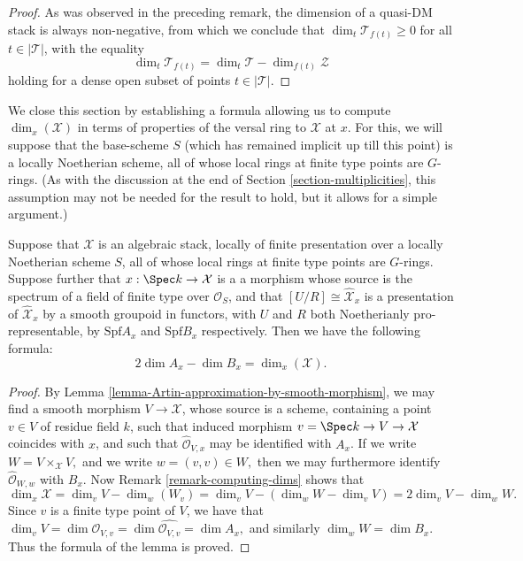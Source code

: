 \begin{proof}
As was observed in the preceding remark,
the dimension of a quasi-DM stack is always non-negative,
from which we conclude that $\dim_t \mathcal{T}_{f(t)} \geq 0$
for all $t \in |\mathcal{T}|$, with the equality
$$
\dim_t \mathcal{T}_{f(t)} = \dim_t \mathcal{T} - \dim_{f(t)} \mathcal{Z}
$$
holding
for a dense open subset of points $t\in |\mathcal{T}|$.
\end{proof}

\noindent
We close this section by establishing a formula allowing us to
compute $\dim_x(\mathcal{X})$ in terms of properties of the versal ring
to $\mathcal{X}$ at $x$.
For this,
we will suppose that the base-scheme $S$ (which has remained implicit
up till this point) is a locally Noetherian scheme, all of whose local rings
at finite type points are $G$-rings. (As with the discussion at the
end of Section \ref{section-multiplicities}, this assumption may not be
needed for the result to hold, but it allows for a simple argument.)

\begin{lemma}
\label{lemma-dimension-formula}
Suppose that $\mathcal{X}$ is an algebraic
stack, locally of finite presentation over a locally Noetherian
scheme $S$, all of whose local rings at finite type points
are $G$-rings.  Suppose further
that $x:\Spec k\to\mathcal{X}$ is a a morphism whose source is the spectrum
of a field of finite type over $\mathcal{O}_S$, and that
$[U/R] \cong \widehat{\mathcal{X}}_x$
is a presentation of $\widehat{\mathcal{X}}_x$
by a smooth groupoid in functors,
with $U$ and $R$ both Noetherianly pro-representable, by
$\text{Spf} A_x$ and $\text{Spf} B_x$ respectively. Then we have the following
formula:
$$
2\dim A_x-\dim B_x=\dim_x(\mathcal{X}).
$$
\end{lemma}

\begin{proof}
By Lemma \ref{lemma-Artin-approximation-by-smooth-morphism},
we may find a smooth morphism $V \to \mathcal{X}$, whose source is a scheme,
containing a point $v \in V$ of residue field $k$, such that induced
morphism $v = \Spec k \to V \to \mathcal{X}$ coincides with $x$,
and such that $\widehat{\mathcal{O}}_{V,x}$ may be identified with $A_x$.
If we write $W =  V\times_{\mathcal{X}} V,$ and we write $w = (v,v) \in W,$
then we may furthermore identify $\widehat{\mathcal{O}}_{W,w}$ with $B_x$.
Now Remark \ref{remark-computing-dims} shows that
$$
\dim_x{\mathcal{X}} = \dim_v V - \dim_{w}(W_v) = \dim_v V -
(\dim_w W - \dim_v V) = 2\dim_v V - \dim_w W.
$$
Since $v$ is a finite type point of $V$, we have that
$\dim_v V = \dim \mathcal{O}_{V,v} = \dim \widehat{\mathcal{O}_{V,v}} =
\dim A_x,$
and similarly $\dim_w W = \dim B_x$.  Thus the formula of the lemma
is proved.
\end{proof}












